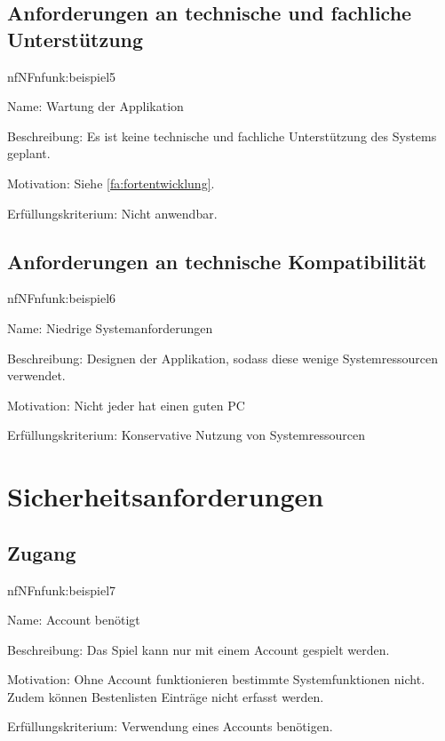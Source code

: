 \subsection{Anforderungen an technische und fachliche Unterstützung}

\begin{description}[leftmargin=5em, style=sameline]	
	\begin{lhp}{nf}{NF}{nfunk:beispiel5}
		\item [Name:] Wartung der Applikation %
		\item [Beschreibung:] Es ist keine technische und fachliche Unterstützung des Systems geplant.
		\item [Motivation:] Siehe \ref{fa:fortentwicklung}.
		\item [Erfüllungskriterium:] Nicht anwendbar.
	\end{lhp}
\end{description}

\subsection{Anforderungen an technische Kompatibilität}

\begin{description}[leftmargin=5em, style=sameline]	
	\begin{lhp}{nf}{NF}{nfunk:beispiel6}
		\item [Name:] Niedrige Systemanforderungen %
		\item [Beschreibung:] Designen der Applikation, sodass diese wenige Systemressourcen verwendet. %
		\item [Motivation:] Nicht jeder hat einen guten PC %
		\item [Erfüllungskriterium:] Konservative Nutzung von Systemressourcen
	\end{lhp}
\end{description}

\section{Sicherheitsanforderungen}

\subsection{Zugang}

\begin{description}[leftmargin=5em, style=sameline]	
	\begin{lhp}{nf}{NF}{nfunk:beispiel7}
		\item [Name:] Account benötigt %
		\item [Beschreibung:] Das Spiel kann nur mit einem Account gespielt werden. %
		\item [Motivation:] Ohne Account funktionieren bestimmte Systemfunktionen nicht. Zudem können Bestenlisten Einträge nicht erfasst werden. %
		\item [Erfüllungskriterium:] Verwendung eines Accounts benötigen. %
	\end{lhp}
\end{description}

